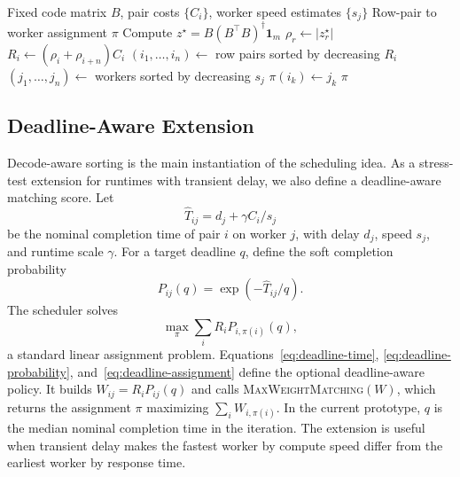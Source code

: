 \begin{algorithm}[t]
  \caption{Decode-aware row-pair assignment}
  \label{alg:decode-aware}
  \begin{algorithmic}[1]
    \Require Fixed code matrix $B$, pair costs $\{C_i\}$, worker speed estimates $\{s_j\}$
    \Ensure Row-pair to worker assignment $\pi$
    \State Compute $z^\star = B(B^\top B)^\dagger \mathbf{1}_m$
      \State $\rho_r \gets |z^\star_r|$
    \EndFor
      \State $R_i \gets (\rho_i + \rho_{i+n}) C_i$
    \EndFor
    \State $(i_1,\ldots,i_n) \gets$ row pairs sorted by decreasing $R_i$
    \State $(j_1,\ldots,j_n) \gets$ workers sorted by decreasing $s_j$
      \State $\pi(i_k) \gets j_k$
    \EndFor
    \State \Return $\pi$
  \end{algorithmic}
\end{algorithm}

\subsection{Deadline-Aware Extension}

Decode-aware sorting is the main instantiation of the scheduling idea.  As a
stress-test extension for runtimes with transient delay, we also define a
deadline-aware matching score.  Let
\begin{equation}
  \label{eq:deadline-time}
  \widehat{T}_{ij} = d_j + \gamma C_i / s_j
\end{equation}
be the nominal completion time of pair $i$ on worker $j$, with delay $d_j$,
speed $s_j$, and runtime scale $\gamma$.  For a target deadline $q$, define the soft
completion probability
\begin{equation}
  \label{eq:deadline-probability}
  P_{ij}(q) = \exp(-\widehat{T}_{ij}/q).
\end{equation}
The scheduler solves
\begin{equation}
  \label{eq:deadline-assignment}
  \max_\pi \sum_i R_i P_{i,\pi(i)}(q),
\end{equation}
a standard linear assignment problem.  Equations~\eqref{eq:deadline-time},
\eqref{eq:deadline-probability}, and~\eqref{eq:deadline-assignment} define the
optional deadline-aware policy.  It builds
$W_{ij}=R_iP_{ij}(q)$ and calls \textsc{MaxWeightMatching}$(W)$, which returns
the assignment $\pi$ maximizing $\sum_i W_{i,\pi(i)}$.  In the current
prototype, $q$ is the median nominal completion time in the iteration.  The
extension is useful when transient delay makes the fastest worker by compute
speed differ from the earliest worker by response time.

